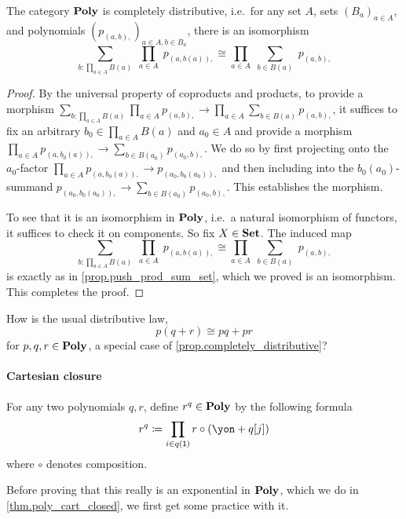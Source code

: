 \documentclass[Book-Poly]{subfiles}
\begin{document}
\begin{proposition}\label{prop.completely_distributive}
The category $\textbf{Poly}$ is completely distributive, i.e.\ for any set $A$, sets $(B_a)_{a\in A}$, and polynomials $(p_{(a,b),})_{a\in A, b\in B_a}$, there is an isomorphism
\[
  \sum_{b\colon\prod_{a\in A}B(a)}\;\prod_{a\in A}\;p_{(a,b(a)),}
  \cong
	\prod_{a\in A}\;\sum_{b\in B(a)}\;p_{(a,b),}
\]
\end{proposition}
\begin{proof}
By the universal property of coproducts and products, to provide a morphism $\sum_{b\colon\prod_{a\in A}B(a)}\prod_{a\in A}p_{(a,b),}
  \to	\prod_{a\in A}\sum_{b\in B(a)}p_{(a,b),}$, it suffices to fix an arbitrary $b_0\in\prod_{a\in A}B(a)$ and $a_0\in A$ and provide a morphism $\prod_{a\in A}p_{(a,b_0(a)),}\to\sum_{b\in B(a_0)}p_{(a_0,b),}$. We do so by first projecting onto the $a_0$-factor $\prod_{a\in A}p_{(a,b_0(a)),}\to p_{(a_0, b_0(a_0)),}$ and then including into the $b_0(a_0)$-summand $p_{(a_0,b_0(a_0)),}\to\sum_{b\in B(a_0)}p_{(a_0,b),}$. This establishes the morphism.
  
  To see that it is an isomorphism in $\textbf{Poly}$, i.e.\ a natural isomorphism of functors, it suffices to check it on components. So fix $X\in\textbf{Set}$. The induced map
  \[
  \sum_{b\colon\prod_{a\in A}B(a)}\;\prod_{a\in A}\;p_{(a,b(a)),}
  \cong
	\prod_{a\in A}\;\sum_{b\in B(a)}\;p_{(a,b),}
  \]
  is exactly as in \cref{prop.push_prod_sum_set}, which we proved is an isomorphism. This completes the proof.
\end{proof}

\begin{exercise}
How is the usual distributive law,
\[
p(q+r)\cong pq+pr
\]
for $p,q,r\in\textbf{Poly}$, a special case of \cref{prop.completely_distributive}?
\end{exercise}

\paragraph{Cartesian closure}
For any two polynomials $q,r$, define $r^q\in\textbf{Poly}$ by the following formula
\begin{equation}\label{eqn.exponential}
  r^q\coloneqq\prod_{i\in q(\1)}r\circ(\yon+q[j])
\end{equation}
where $\circ$ denotes composition.

Before proving that this really is an exponential in $\textbf{Poly}$, which we do in \cref{thm.poly_cart_closed}, we first get some practice with it.
\end{document}
